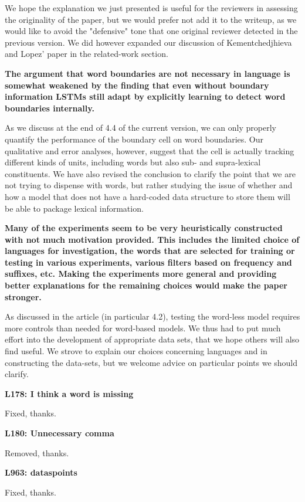 \documentclass{article}[11pt,a4paper,oneside]
\begin{document}
We hope the explanation we just presented is useful for the reviewers in assessing the originality of the paper, but we would prefer not add it to the writeup, as we would like to avoid the "defensive" tone that one original reviewer detected in the previous version. We did however expanded our discussion of Kementchedjhieva and Lopez' paper in the related-work section.\newline

\textbf{The argument that word boundaries are not necessary in language is somewhat
weakened by the finding that even without boundary information LSTMs still
adapt by explicitly learning to detect word boundaries internally.}

As we discuss at the end of 4.4 of the current version, we can only properly quantify the performance of the boundary cell on word boundaries. Our qualitative and error analyses, however, suggest that the cell is actually tracking different kinds of units, including words but also sub- and supra-lexical constituents. We have also revised the conclusion to clarify the point that we are not trying to dispense with words, but rather studying the issue of whether and how a model that does not have a hard-coded data structure to store them will be able to package lexical information.\newline

\textbf{Many of the experiments seem to be very heuristically constructed with not
much motivation provided. This includes the limited choice of languages for
investigation, the words that are selected for training or testing in
various experiments, various filters based on frequency and suffixes, etc.
Making the experiments more general and providing better explanations for
the remaining choices would make the paper stronger.}

As discussed in the article (in particular 4.2), testing the word-less model requires more controls than needed for word-based models. We thus had to put much effort into the development of appropriate data sets, that we hope others will also find useful. We strove to explain our choices concerning languages and in constructing the data-sets, but we welcome advice on particular points we should clarify.\newline

\textbf{L178: I think a word is missing}

Fixed, thanks.\newline

\textbf{L180: Unnecessary comma}

Removed, thanks.\newline

\textbf{L963: dataspoints}

Fixed, thanks.
\end{document}
